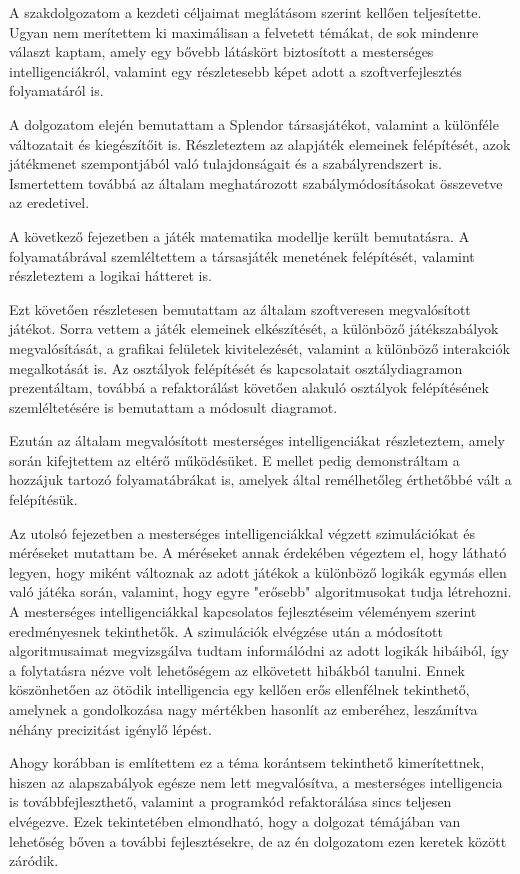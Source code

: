 
A szakdolgozatom a kezdeti céljaimat meglátásom szerint kellően teljesítette. Ugyan nem merítettem ki maximálisan a felvetett témákat, de sok mindenre választ kaptam, amely egy bővebb látáskört biztosított a mesterséges intelligenciákról, valamint egy részletesebb képet adott a szoftverfejlesztés folyamatáról is.

A dolgozatom elején bemutattam a Splendor társasjátékot, valamint a különféle változatait és kiegészítőit is. Részleteztem az alapjáték elemeinek felépítését, azok játékmenet szempontjából való tulajdonságait és a szabályrendszert is. Ismertettem továbbá az általam meghatározott szabálymódosításokat összevetve az eredetivel.

A következő fejezetben a játék matematika modellje került bemutatásra. A folyamatábrával szemléltettem a társasjáték menetének felépítését, valamint részleteztem a logikai hátteret is.

Ezt követően részletesen bemutattam az általam szoftveresen megvalósított játékot. Sorra vettem a játék elemeinek elkészítését, a különböző játékszabályok megvalósítását, a grafikai felületek kivitelezését, valamint a különböző interakciók megalkotását is. Az osztályok felépítését és kapcsolatait osztálydiagramon prezentáltam, továbbá a refaktorálást követően alakuló osztályok felépítésének szemléltetésére is bemutattam a módosult diagramot.

Ezután az általam megvalósított mesterséges intelligenciákat részleteztem, amely során kifejtettem az eltérő működésüket. E mellet pedig demonstráltam a hozzájuk tartozó folyamatábrákat is, amelyek által remélhetőleg érthetőbbé vált a felépítésük.

Az utolsó fejezetben a mesterséges intelligenciákkal végzett szimulációkat és méréseket mutattam be. A méréseket annak érdekében végeztem el, hogy látható legyen, hogy miként változnak az adott játékok a különböző logikák egymás ellen való játéka során, valamint, hogy egyre "erősebb" algoritmusokat tudja létrehozni. A mesterséges intelligenciákkal kapcsolatos fejlesztéseim véleményem szerint eredményesnek tekinthetők. A szimulációk elvégzése után a módosított algoritmusaimat megvizsgálva tudtam informálódni az adott logikák hibáiból, így a folytatásra nézve volt lehetőségem az elkövetett hibákból tanulni. Ennek köszönhetően az ötödik intelligencia egy kellően erős ellenfélnek tekinthető, amelynek a gondolkozása nagy mértékben hasonlít az emberéhez, leszámítva néhány precizitást igénylő lépést.

Ahogy korábban is említettem ez a téma korántsem tekinthető kimerítettnek, hiszen az alapszabályok egésze nem lett megvalósítva, a mesterséges intelligencia is továbbfejleszthető, valamint a programkód refaktorálása sincs teljesen elvégezve. Ezek tekintetében elmondható, hogy a dolgozat témájában van lehetőség bőven a további fejlesztésekre, de az én dolgozatom ezen keretek között záródik.
